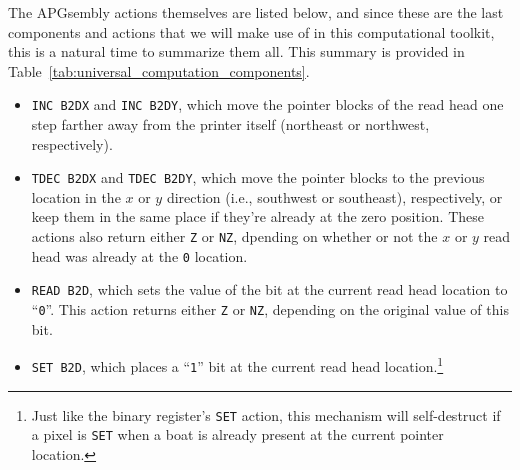 The APGsembly actions themselves are listed below, and since these are the last components and actions that we will make use of in this computational toolkit, this is a natural time to summarize them all. This summary is provided in Table~\ref{tab:universal_computation_components}.\smallskip

\begin{itemize}
	\item \texttt{INC B2DX} and \texttt{INC B2DY}, which move the pointer blocks of the read head one step farther away from the printer itself (northeast or northwest, respectively).\smallskip
	
	\item \texttt{TDEC B2DX} and \texttt{TDEC B2DY}, which move the pointer blocks to the previous location in the $x$ or $y$ direction (i.e., southwest or southeast), respectively, or keep them in the same place if they're already at the zero position. These actions also return either \texttt{Z} or \texttt{NZ}, dpending on whether or not the $x$ or $y$ read head was already at the \texttt{0} location.\smallskip
	
	\item \texttt{READ B2D}, which sets the value of the bit at the current read head location to ``\texttt{0}''. This action returns either \texttt{Z} or \texttt{NZ}, depending on the original value of this bit.\smallskip
	
	\item \texttt{SET B2D}, which places a ``\texttt{1}'' bit at the current read head location.\footnote{Just like the binary register's \texttt{SET} action, this mechanism will self-destruct if a pixel is \texttt{SET} when a boat is already present at the current pointer location.}\smallskip
\end{itemize}

